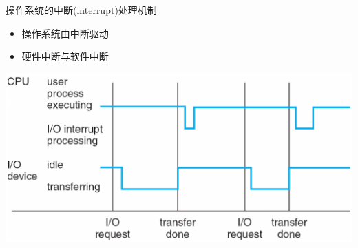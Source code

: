 \documentclass[xcolor=svgnames]{beamer}
\begin{document}
\begin{CJK*}{UTF8}{gbsn}
\begin{frame}{操作系统的中断(interrupt)处理机制}
\begin{itemize}
\item 操作系统由中断驱动
\item 硬件中断与软件中断
\end{itemize}
\includegraphics[width=1.0\textwidth]{interrupt.png}
\end{frame}


\end{CJK*}
\end{document}
